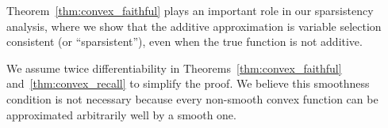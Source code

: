 Theorem~\ref{thm:convex_faithful} plays an important role in our
sparsistency analysis, where we show that the additive
approximation is variable selection consistent (or ``sparsistent''), even when the true function is not
additive.

\begin{remark}
  We assume twice differentiability in
  Theorems~\ref{thm:convex_faithful} and~\ref{thm:convex_recall} to simplify the proof. 
  We believe
  this smoothness condition is not necessary because every non-smooth
  convex function can be approximated arbitrarily well by a smooth
  one.  
\end{remark}



 


